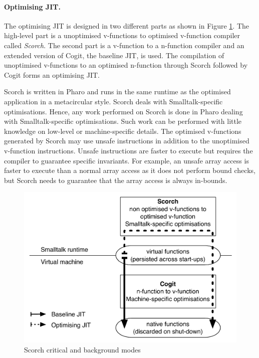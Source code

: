 \documentclass[a4paper,12pt,twoside]{../includes/ThesisStyle}
\begin{document}
\paragraph{Optimising JIT.}
The optimising JIT is designed in two different parts as shown in Figure \ref{fig:OptArchitecture}. The high-level part is a unoptimised v-functions to optimised v-function compiler called \emph{Scorch}. The second part is a v-function to a n-function compiler and an extended version of Cogit, the baseline JIT, is used. The compilation of unoptimised v-functions to an optimised n-function through Scorch followed by Cogit forms an optimising JIT.

Scorch is written in Pharo and runs in the same runtime as the optimised application in a metacircular style. Scorch deals with Smalltalk-specific optimisations. Hence, any work performed on Scorch is done in Pharo dealing with Smalltalk-specific optimisations. Such work can be performed with little knowledge on low-level or machine-specific details. The optimised v-functions generated by Scorch may use unsafe instructions in addition to the unoptimised v-function instructions. Unsafe instructions are faster to execute but requires the compiler to guarantee specific invariants. For example, an unsafe array access is faster to execute than a normal array access as it does not perform bound checks, but Scorch needs to guarantee that the array access is always in-bounds.

\begin{figure}[h!]
    \begin{center}
        \includegraphics[width=0.8\linewidth]{OptArchitecture}
        \caption{Scorch critical and background modes}
        \label{fig:OptArchitecture}
    \end{center}
\end{figure}
\end{document}
